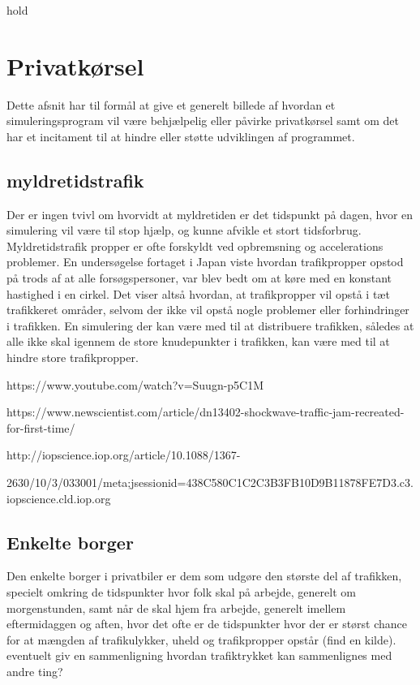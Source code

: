 hold

\section{Privatkørsel}

Dette afsnit har til formål at give et generelt billede af hvordan et simuleringsprogram vil være behjælpelig eller påvirke privatkørsel samt om det har et incitament til at hindre eller støtte udviklingen af programmet.

\subsection{myldretidstrafik}

Der er ingen tvivl om hvorvidt at myldretiden er det tidspunkt på dagen, hvor en simulering vil være til stop hjælp, og kunne afvikle et stort tidsforbrug. Myldretidstrafik propper er ofte forskyldt ved opbremsning og accelerations problemer. En undersøgelse fortaget i Japan viste  hvordan trafikpropper opstod på trods af at alle forsøgspersoner, var blev bedt om at køre med en konstant hastighed i en cirkel. Det viser altså hvordan, at trafikpropper vil opstå i tæt trafikkeret områder, selvom der ikke vil opstå nogle problemer eller forhindringer i trafikken. En simulering der kan være med til at distribuere trafikken, således at alle ikke skal igennem de store knudepunkter i trafikken, kan være med til at hindre store trafikpropper.

https://www.youtube.com/watch?v=Suugn-p5C1M

https://www.newscientist.com/article/dn13402-shockwave-traffic-jam-recreated-for-first-time/

http://iopscience.iop.org/article/10.1088/1367-

2630/10/3/033001/meta;jsessionid=438C580C1C2C3B3FB10D9B11878FE7D3.c3.iopscience.cld.iop.org

\subsection{Enkelte borger}

Den enkelte borger i privatbiler er dem som udgøre den største del af trafikken, specielt omkring de tidspunkter hvor folk skal på arbejde, generelt om morgenstunden, samt når de skal hjem fra arbejde, generelt imellem eftermidaggen og aften, hvor det ofte er de tidspunkter hvor der er størst chance for at mængden af trafikulykker, uheld og trafikpropper opstår (find en kilde). eventuelt giv en sammenligning hvordan trafiktrykket kan sammenlignes med andre ting?

